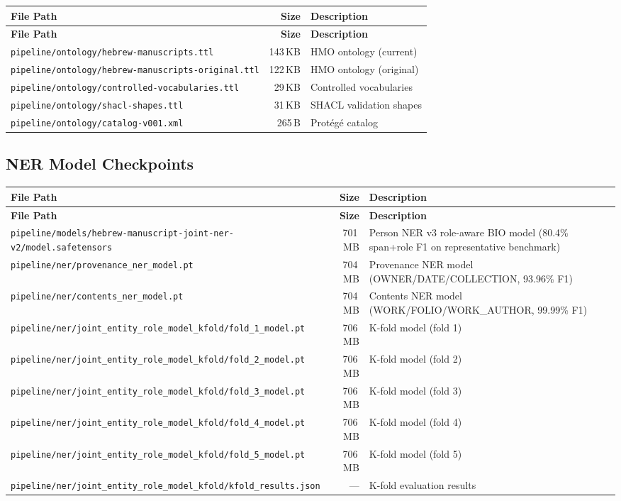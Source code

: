 \documentclass[12pt]{article}
\newcommand{\filepath}[1]{\texttt{\small #1}}
\begin{document}
\begin{longtable}{|p{9cm}|r|p{3cm}|}
\hline
\textbf{File Path} & \textbf{Size} & \textbf{Description} \\
\hline
\endfirsthead
\hline
\textbf{File Path} & \textbf{Size} & \textbf{Description} \\
\hline
\endhead
\hline
\endfoot
\filepath{pipeline/ontology/hebrew-manuscripts.ttl} & 143\,KB & HMO ontology (current) \\
\hline
\filepath{pipeline/ontology/hebrew-manuscripts-original.ttl} & 122\,KB & HMO ontology (original) \\
\hline
\filepath{pipeline/ontology/controlled-vocabularies.ttl} & 29\,KB & Controlled vocabularies \\
\hline
\filepath{pipeline/ontology/shacl-shapes.ttl} & 31\,KB & SHACL validation shapes \\
\hline
\filepath{pipeline/ontology/catalog-v001.xml} & 265\,B & Prot\'{e}g\'{e} catalog \\
\hline
\end{longtable}

\subsection{NER Model Checkpoints}

\begin{longtable}{|p{9cm}|r|p{3cm}|}
\hline
\textbf{File Path} & \textbf{Size} & \textbf{Description} \\
\hline
\endfirsthead
\hline
\textbf{File Path} & \textbf{Size} & \textbf{Description} \\
\hline
\endhead
\hline
\endfoot
\filepath{pipeline/models/hebrew-manuscript-joint-ner-v2/model.safetensors} & 701\,MB & Person NER v3 role-aware BIO model (80.4\% span+role F1 on representative benchmark) \\
\hline
\filepath{pipeline/ner/provenance\_ner\_model.pt} & 704\,MB & Provenance NER model (OWNER/DATE/COLLECTION, 93.96\% F1) \\
\hline
\filepath{pipeline/ner/contents\_ner\_model.pt} & 704\,MB & Contents NER model (WORK/FOLIO/WORK\_AUTHOR, 99.99\% F1) \\
\hline
\filepath{pipeline/ner/joint\_entity\_role\_model\_kfold/fold\_1\_model.pt} & 706\,MB & K-fold model (fold 1) \\
\hline
\filepath{pipeline/ner/joint\_entity\_role\_model\_kfold/fold\_2\_model.pt} & 706\,MB & K-fold model (fold 2) \\
\hline
\filepath{pipeline/ner/joint\_entity\_role\_model\_kfold/fold\_3\_model.pt} & 706\,MB & K-fold model (fold 3) \\
\hline
\filepath{pipeline/ner/joint\_entity\_role\_model\_kfold/fold\_4\_model.pt} & 706\,MB & K-fold model (fold 4) \\
\hline
\filepath{pipeline/ner/joint\_entity\_role\_model\_kfold/fold\_5\_model.pt} & 706\,MB & K-fold model (fold 5) \\
\hline
\filepath{pipeline/ner/joint\_entity\_role\_model\_kfold/kfold\_results.json} & --- & K-fold evaluation results \\
\hline
\end{longtable}
\end{document}
